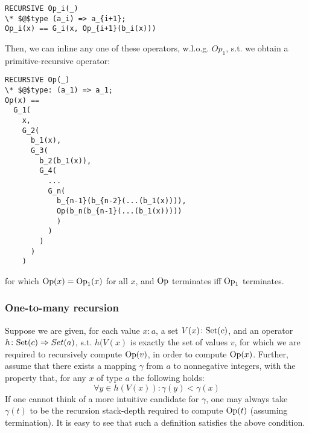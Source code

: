 \begin{lstlisting}[language=tla,columns=fullflexible]
RECURSIVE Op_i(_)
\* $@$type (a_i) => a_{i+1};
Op_i(x) == G_i(x, Op_{i+1}(b_i(x)))
\end{lstlisting}
%
Then, we can inline any one of these operators, w.l.o.g. $Op_1$, s.t. we obtain a primitive-recursive operator:
\begin{lstlisting}[language=tla,columns=fullflexible]
RECURSIVE Op(_)
\* $@$type: (a_1) => a_1;
Op(x) ==
  G_1(
    x, 
    G_2( 
      b_1(x),
      G_3(
        b_2(b_1(x)),
        G_4(
          ...
          G_n( 
            b_{n-1}(b_{n-2}(...(b_1(x)))),
            Op(b_n(b_{n-1}(...(b_1(x)))))
            )
          )
        )
      )
    )
\end{lstlisting}
for which $\mathrm{Op}(x) = \mathrm{Op}_1(x)$ for all $x$, and $\mathrm{Op}$ terminates iff $\mathrm{Op}_1$ terminates.

\subsubsection{One-to-many recursion}

Suppose we are given, for each value $x: a$, a set $V(x)\colon \mathrm{Set}(c)$, and an operator $h\colon \mathrm{Set}(c) \Rightarrow Set(a)$, s.t. $h(V(x)$ is exactly the set of values $v$, for which we are required to recursively compute $\mathrm{Op}(v)$, in order to compute $\mathrm{Op}(x)$. 
Further, assume that there exists a mapping $\gamma$ from $a$ to nonnegative integers, with the property that, for any $x$ of type $a$ the following holds:
\[
\forall y \in h(V(x))\colon \gamma(y) < \gamma(x) 
\]
%
If one cannot think of a more intuitive candidate for $\gamma$, one may always take $\gamma(t)$ to be the recursion stack-depth required to compute $\mathrm{Op}(t)$ (assuming termination). It is easy to see that such a definition satisfies the above condition.

